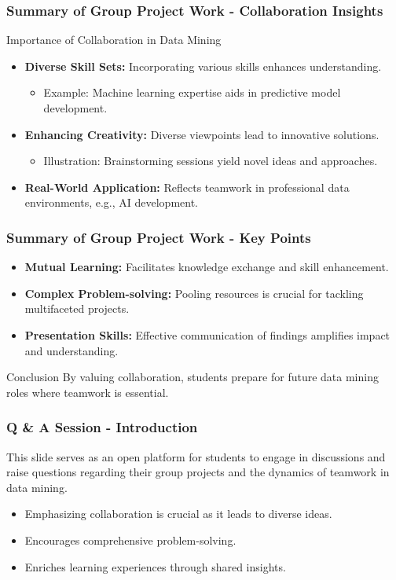 \documentclass[aspectratio=169]{beamer}
\begin{document}
\begin{frame}[fragile]
    \frametitle{Summary of Group Project Work - Collaboration Insights}
    \begin{block}{Importance of Collaboration in Data Mining}
        \begin{itemize}
            \item \textbf{Diverse Skill Sets:} Incorporating various skills enhances understanding.
                \begin{itemize}
                    \item Example: Machine learning expertise aids in predictive model development.
                \end{itemize}
            \item \textbf{Enhancing Creativity:} Diverse viewpoints lead to innovative solutions.
                \begin{itemize}
                    \item Illustration: Brainstorming sessions yield novel ideas and approaches.
                \end{itemize}
            \item \textbf{Real-World Application:} Reflects teamwork in professional data environments, e.g., AI development.
        \end{itemize}
    \end{block}
\end{frame}

\begin{frame}[fragile]
    \frametitle{Summary of Group Project Work - Key Points}
    \begin{itemize}
        \item \textbf{Mutual Learning:} Facilitates knowledge exchange and skill enhancement.
        \item \textbf{Complex Problem-solving:} Pooling resources is crucial for tackling multifaceted projects.
        \item \textbf{Presentation Skills:} Effective communication of findings amplifies impact and understanding.
    \end{itemize}
    
    \begin{block}{Conclusion}
        By valuing collaboration, students prepare for future data mining roles where teamwork is essential.
    \end{block}
\end{frame}

\begin{frame}[fragile]
    \frametitle{Q \& A Session - Introduction}
    This slide serves as an open platform for students to engage in discussions and raise questions regarding their group projects and the dynamics of teamwork in data mining. 
    \begin{itemize}
        \item Emphasizing collaboration is crucial as it leads to diverse ideas.
        \item Encourages comprehensive problem-solving. 
        \item Enriches learning experiences through shared insights.
    \end{itemize}
\end{frame}
\end{document}
